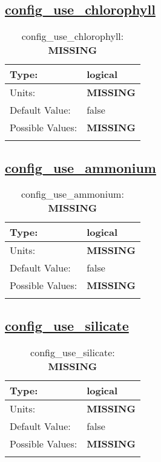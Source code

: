 \subsection[config\_use\_chlorophyll]{\hyperref[sec:nm_tab_biogeochemistry]{config\_use\_chlorophyll}}
\label{subsec:nm_sec_config_use_chlorophyll}
\begin{center}
\begin{longtable}{| p{2.0in} || p{4.0in} |}
    \hline
    Type: & logical \\
    \hline
    Units: & {\bf \color{red} MISSING} \\
    \hline
    Default Value: & false \\
    \hline
    Possible Values: & {\bf \color{red} MISSING} \\
    \hline
    \caption{config\_use\_chlorophyll: {\bf \color{red} MISSING}}
\end{longtable}
\end{center}
\subsection[config\_use\_ammonium]{\hyperref[sec:nm_tab_biogeochemistry]{config\_use\_ammonium}}
\label{subsec:nm_sec_config_use_ammonium}
\begin{center}
\begin{longtable}{| p{2.0in} || p{4.0in} |}
    \hline
    Type: & logical \\
    \hline
    Units: & {\bf \color{red} MISSING} \\
    \hline
    Default Value: & false \\
    \hline
    Possible Values: & {\bf \color{red} MISSING} \\
    \hline
    \caption{config\_use\_ammonium: {\bf \color{red} MISSING}}
\end{longtable}
\end{center}
\subsection[config\_use\_silicate]{\hyperref[sec:nm_tab_biogeochemistry]{config\_use\_silicate}}
\label{subsec:nm_sec_config_use_silicate}
\begin{center}
\begin{longtable}{| p{2.0in} || p{4.0in} |}
    \hline
    Type: & logical \\
    \hline
    Units: & {\bf \color{red} MISSING} \\
    \hline
    Default Value: & false \\
    \hline
    Possible Values: & {\bf \color{red} MISSING} \\
    \hline
    \caption{config\_use\_silicate: {\bf \color{red} MISSING}}
\end{longtable}
\end{center}

